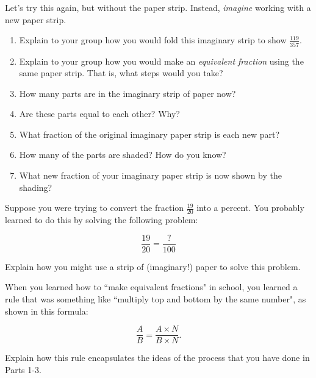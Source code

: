 \documentclass{ximera}
\begin{document}
\begin{question}
 Let's try this again, but without the paper strip.  Instead, \emph{imagine} working with a new paper strip.  
\begin{enumerate}
    \item Explain to your group how you would fold this imaginary strip to show $\frac{119}{357}$.   
    \item Explain to your group how you would make an \emph{equivalent fraction} using the same paper strip.  That is, what steps would you take?
   \item   How many parts are in the imaginary strip of paper now?
    \item   Are these parts equal to each other?  Why?
    \item   What fraction of the original imaginary paper strip is each new part?
    \item   How many of the parts are shaded? How do you know?
    \item   What new fraction of your imaginary paper strip is now shown by the shading?  
\end{enumerate}
\end{question}

\newpage

\begin{question}
Suppose you were trying to convert the fraction $\frac{19}{20}$ into a percent.  You probably learned to do this by solving the following problem:

\[ \frac{19}{20} = \frac{?}{100} \]

Explain how you might use a strip of (imaginary!) paper  to solve this problem.
\end{question}




\begin{question}
When you learned how to ``make equivalent fractions" in school, you learned a rule that was something like ``multiply top and bottom by the same number", as shown in this formula:

  \[ \frac{A}{B} = \frac{A \times N}{B \times N}. \]

Explain how this rule encapsulates the ideas of the process that you have done in Parts 1-3.
\end{question}
\end{document}

